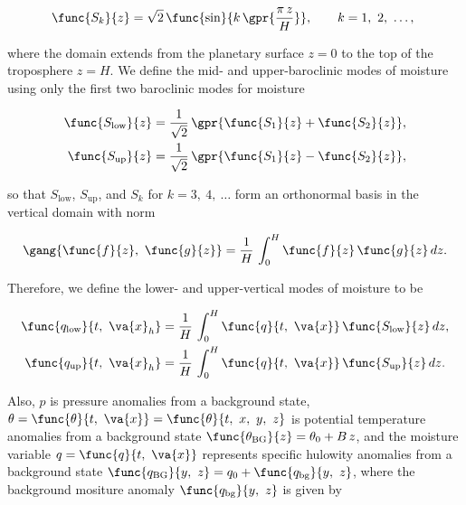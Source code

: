 \begin{equation}
	\func{S_k}{z} = \sqrt{2}\,\func{\sin}{k\,\gpr{\frac{\pi\,z}{H}}},\qquad k = 1,\ 2,\ \dots,\ 
\end{equation}

where the domain extends from the planetary surface $z = 0$ to the top of the troposphere $z = H$. We define the mid- and upper-baroclinic modes of moisture using only the first two baroclinic modes for moisture

\begin{subequations}
	\begin{align}
		\func{S_{\text{low}}}{z} &= \frac{1}{\sqrt{2}}\,\gpr{\func{S_1}{z} + \func{S_2}{z}}, \\
		\func{S_{\text{up}}}{z} &= \frac{1}{\sqrt{2}}\,\gpr{\func{S_1}{z} - \func{S_2}{z}},
	\end{align}
\end{subequations}

so that $S_{\text{low}}$, $S_{\text{up}}$, and $S_k$ for $k = 3,\ 4,\ \dots$ form an orthonormal basis in the vertical domain with norm

\begin{equation}
	\gang{\func{f}{z},\ \func{g}{z}} = \frac{1}{H}\,\int_{0}^{H} \func{f}{z}\,\func{g}{z}\,dz.
\end{equation}

Therefore, we define the lower- and upper-vertical modes of moisture to be

\begin{subequations}
	\begin{align}
		\func{q_{\text{low}}}{t,\ \va{x}_h} &= \frac{1}{H}\,\int_{0}^{H} \func{q}{t,\ \va{x}}\,\func{S_{\text{low}}}{z}\,dz, \\
		\func{q_{\text{up}}}{t,\ \va{x}_h} &= \frac{1}{H}\,\int_{0}^{H} \func{q}{t,\ \va{x}}\,\func{S_{\text{up}}}{z}\,dz.
	\end{align}
\end{subequations}


Also, $p$ is pressure anomalies from a background state, $\theta = \func{\theta}{t,\ \va{x}} = \func{\theta}{t,\ x,\ y,\ z}$ is potential temperature anomalies from a background state $\func{\theta_{\text{BG}}}{z} = \theta_0 + B\,z$, and the moisture variable $q = \func{q}{t,\ \va{x}}$ represents specific hulowity anomalies from a background state $\func{q_{\text{BG}}}{y,\ z} = q_0 + \func{q_{\text{bg}}}{y,\ z}$, where the background mositure anomaly $\func{q_{\text{bg}}}{y,\ z}$ is given by

